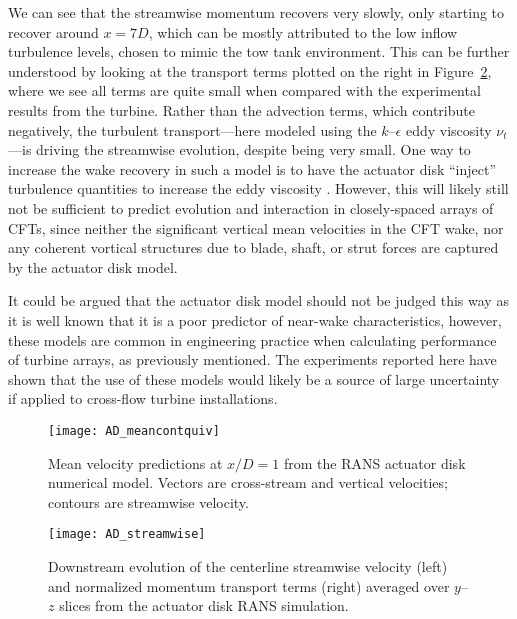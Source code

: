 We can see that the streamwise momentum recovers very slowly, only starting to
recover around $x=7D$, which can be mostly attributed to the low inflow
turbulence levels, chosen to mimic the tow tank environment. This can be further
understood by looking at the transport terms plotted on the right in
Figure~\ref{fig:AD-streamwise}, where we see all terms are quite small when
compared with the experimental results from the turbine. Rather than the
advection terms, which contribute negatively, the turbulent transport---here
modeled using the $k$--$\epsilon$ eddy viscosity $\nu_t$---is driving the
streamwise evolution, despite being very small. One way to increase the wake
recovery in such a model is to have the actuator disk ``inject'' turbulence
quantities to increase the eddy viscosity \cite{James2011, Nelson2013}. However,
this will likely still not be sufficient to predict evolution and interaction in
closely-spaced arrays of CFTs, since neither the significant vertical mean
velocities in the CFT wake, nor any coherent vortical structures
due to blade, shaft, or strut forces are captured by the actuator disk model.


It could be argued that the actuator disk model should not be judged this way as
it is well known that it is a poor predictor of near-wake characteristics,
however, these models are common in engineering practice when calculating
performance of turbine arrays, as previously mentioned. The experiments reported
here have shown that the use of these models would likely be a source of large
uncertainty if applied to cross-flow turbine installations.

\begin{figure}
    \centering

    \texttt{[image: AD\_meancontquiv]}

    \caption{Mean velocity predictions at $x/D=1$ from the RANS actuator disk
        numerical model. Vectors are cross-stream and vertical velocities; contours
        are streamwise velocity.}

    \label{fig:AD-contours}
\end{figure}

\begin{figure}
    \centering

    \texttt{[image: AD\_streamwise]}

    \caption{Downstream evolution of the centerline streamwise velocity (left)
        and normalized momentum transport terms (right) averaged over $y$--$z$
        slices from the actuator disk RANS simulation.}

    \label{fig:AD-streamwise}
\end{figure}

